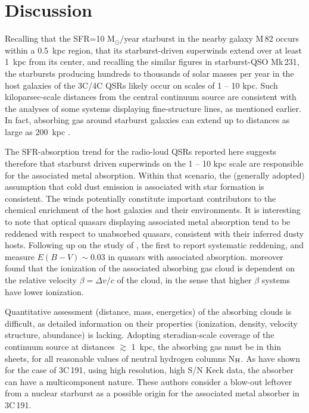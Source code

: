 \documentclass[preprint]{aastex}
\begin{document}
\section{Discussion}

Recalling that the SFR=10 M$_{\odot}$/year starburst in the nearby
galaxy M\,82 occurs \citep{fenech08} within a 0.5~kpc region, that its
starburst-driven superwinds \citep{heckman90} extend over at least 1~kpc
from its center, and recalling the similar figures \citep{rupke13} in
starburst-QSO Mk\,231, the starbursts producing hundreds to thousands of
solar masses per year in the host galaxies of the 3C/4C QSRs likely
occur on scales of 1 -- 10 kpc.  Such kiloparsec-scale distances from
the central continuum source are consistent with the analyses
\citep{williams75, hamann01, sargent82} of some systems displaying
fine-structure lines, as mentioned earlier.  In fact, 
absorbing gas around starburst galaxies can extend up to distances as
large as 200~kpc \citep{bortha13}. 

The SFR-absorption trend for the radio-loud QSRs reported here suggests
therefore that starburst driven superwinds on the 1 -- 10 kpc scale are
responsible for the associated metal absorption.  Within that scenario,
the (generally adopted) assumption that cold dust emission is associated
with star formation is consistent.  The winds potentially constitute
important contributors to the chemical enrichment \citep{hamann99} of
the host galaxies and their environments.  It is interesting to note
that optical quasars displaying associated metal absorption tend to be
reddened with respect to unabsorbed quasars, consistent with their
inferred dusty hosts.  Following up on the  study of
\citet{vester03}, the first to report systematic reddening,
\citet{vdberk08} and \citet{shen12} measure $E(B-V) \sim 0.03$ in
quasars with associated  absorption.  \citet{vdberk08}
moreover found that the ionization of the associated absorbing gas cloud
is dependent on the relative velocity $\beta = \Delta{v}/c$ of the
cloud, in the sense that higher $\beta$ systems have lower ionization. 

Quantitative assessment (distance, mass, energetics) of the absorbing
clouds is difficult, as detailed information on their properties
(ionization, density, velocity structure, abundance) is lacking. 
Adopting steradian-scale coverage of the continuum source at distances
$\gtrsim$ 1~kpc, the absorbing gas must be in thin sheets, for all
reasonable values of neutral hydrogen columns N$_{\rm H}$.  As
\citet{hamann01} have shown for the case of 3C\,191, using high
resolution, high S/N Keck data, the absorber can have a multicomponent
nature.  These authors consider a blow-out leftover from a nuclear
starburst as a possible origin for the associated metal absorber in
3C\,191. 
\end{document}
